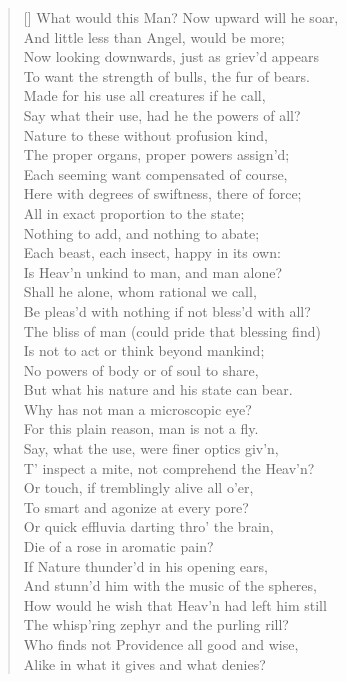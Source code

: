 \begin{verse}[\versewidth]
What would this Man? Now upward will he soar,\\
And little less than Angel, would be more;\\
Now looking downwards, just as griev'd appears\\
To want the strength of bulls, the fur of bears.\\
Made for his use all creatures if he call,\\
Say what their use, had he the powers of all?\\
Nature to these without profusion kind,\\
The proper organs, proper powers assign'd;\\
Each seeming want compensated of course,\\
Here with degrees of swiftness, there of force;\\
All in exact proportion to the state;\\
Nothing to add, and nothing to abate;\\
Each beast, each insect, happy in its own:\\
Is Heav'n unkind to man, and man alone?\\
Shall he alone, whom rational we call,\\
Be pleas'd with nothing if not bless'd with all?\\
\vin The bliss of man (could pride that blessing find)\\
Is not to act or think beyond mankind;\\
No powers of body or of soul to share,\\
But what his nature and his state can bear.\\
Why has not man a microscopic eye?\\
For this plain reason, man is not a fly.\\
Say, what the use, were finer optics giv'n,\\
T' inspect a mite, not comprehend the Heav'n?\\
Or touch, if tremblingly alive all o'er,\\
To smart and agonize at every pore?\\
Or quick effluvia darting thro' the brain,\\
Die of a rose in aromatic pain?\\
If Nature thunder'd in his opening ears,\\
And stunn'd him with the music of the spheres,\\
How would he wish that Heav'n had left him still\\
The whisp'ring zephyr and the purling rill?\\
Who finds not Providence all good and wise,\\
Alike in what it gives and what denies?


\end{verse}
